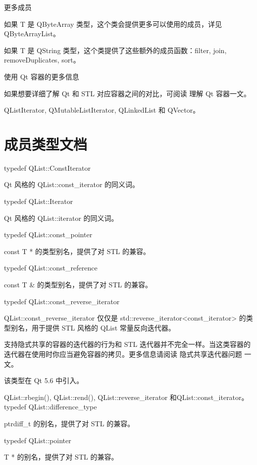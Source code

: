 更多成员

如果 T 是 QByteArray 类型，这个类会提供更多可以使用的成员，详见 QByteArrayList。

如果 T 是 QString 类型，这个类提供了这些额外的成员函数：filter, join, removeDuplicates, sort。

使用 Qt 容器的更多信息

如果想要详细了解 Qt 和 STL 对应容器之间的对比，可阅读 理解 Qt 容器一文。

\begin{seeAlso}
QListIterator, QMutableListIterator, QLinkedList 和 QVector。
\end{seeAlso}

\section{成员类型文档}

typedef QList::ConstIterator

Qt 风格的 QList::const\_iterator 的同义词。

typedef QList::Iterator

Qt 风格的 QList::iterator 的同义词。

typedef QList::const\_pointer

const T * 的类型别名，提供了对 STL 的兼容。

typedef QList::const\_reference

const T \& 的类型别名，提供了对 STL 的兼容。

typedef QList::const\_reverse\_iterator

QList::const\_reverse\_iterator 仅仅是 std::reverse\_iterator<const\_iterator> 的类型别名，用于提供 STL 风格的 QList 常量反向迭代器。

\begin{notice}
支持隐式共享的容器的迭代器的行为和 STL 迭代器并不完全一样。当这类容器的迭代器在使用时你应当避免容器的拷贝。更多信息请阅读 隐式共享迭代器问题 一文。
\end{notice}

该类型在 Qt 5.6 中引入。

\begin{seeAlso}
QList::rbegin(), QList::rend(), QList::reverse\_iterator 和QList::const\_iterator。
typedef QList::difference\_type
\end{seeAlso}

ptrdiff\_t 的别名，提供了对 STL 的兼容。

typedef QList::pointer

T * 的别名，提供了对 STL 的兼容。


